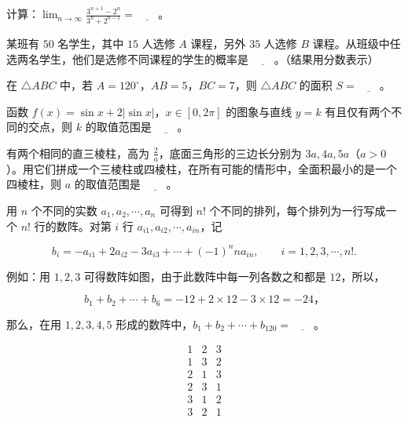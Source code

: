 \begin{question}
计算：$\displaystyle\lim_{n\to\infty}\frac{3^{n+1}-2^n}{3^n+2^{n-1}}=\underline{\qquad}$。

\end{question}
\begin{question}
某班有 $50$ 名学生，其中 $15$ 人选修 $A$ 课程，另外 $35$ 人选修 $B$ 课程。从班级中任选两名学生，他们是选修不同课程的学生的概率是 $\underline{\qquad}$。（结果用分数表示）

\end{question}
\begin{question}
在 $\triangle ABC$ 中，若 $A=120^\circ$，$AB=5$，$BC=7$，则 $\triangle ABC$ 的面积 $S=\underline{\qquad}$。

\end{question}
\begin{question}
函数 $f(x)=\sin x+2|\sin x|$，$x\in[0,2\pi]$ 的图象与直线 $y=k$ 有且仅有两个不同的交点，则 $k$ 的取值范围是 $\underline{\qquad}$。

\Needspace{0.4\textheight}
\end{question}
\begin{question}
有两个相同的直三棱柱，高为 $\frac{2}{a}$，底面三角形的三边长分别为 $3a,4a,5a$（$a>0$）。用它们拼成一个三棱柱或四棱柱，在所有可能的情形中，全面积最小的是一个四棱柱，则 $a$ 的取值范围是 $\underline{\qquad}$。
\nopagebreak[4]
\begin{center}\end{center}
\nopagebreak[4]
\end{question}
\begin{question}
用 $n$ 个不同的实数 $a_1,a_2,\cdots,a_n$ 可得到 $n!$ 个不同的排列，每个排列为一行写成一个 $n!$ 行的数阵。对第 $i$ 行 $a_{i1},a_{i2},\cdots,a_{in}$，记

\nopagebreak[4]
\[
b_i=-a_{i1}+2a_{i2}-3a_{i3}+\cdots+(-1)^nna_{in},\qquad i=1,2,3,\cdots,n!.
\]

例如：用 $1,2,3$ 可得数阵如图，由于此数阵中每一列各数之和都是 $12$，所以，

\nopagebreak[4]
\[
b_1+b_2+\cdots+b_6=-12+2\times12-3\times12=-24\text{，}
\]

那么，在用 $1,2,3,4,5$ 形成的数阵中，$b_1+b_2+\cdots+b_{120}=\underline{\qquad}$。

\nopagebreak[4]
\[
\begin{array}{ccc}
1&2&3\\
1&3&2\\
2&1&3\\
2&3&1\\
3&1&2\\
3&2&1
\end{array}
\]

\end{question}


